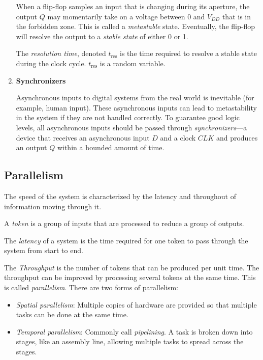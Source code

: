 \documentclass[12pt]{article}
\begin{document}
\begin{enumerate}
  When a flip-flop samples an input that is changing during its aperture, the output $Q$ may momentarily take on a voltage between 0 and $V_{DD}$ that is in the forbidden zone. This is called a \textit{metastable} state. Eventually, the flip-flop will resolve the output to a \textit{stable state} of either 0 or 1.

  The \textit{resolution time}, denoted $t_{\text{res}}$ is the time required to resolve a stable state during the clock cycle. $t_{\text{res}}$ is a random variable.

  \item \textbf{Synchronizers}

  Asynchronous inputs to digital systems from the real world is inevitable (for example, human input). These asynchronous inputs can lead to metastability in the system if they are not handled correctly. To guarantee good logic levels, all asynchronous inputs should be passed through \textit{synchronizers}---a device that receives an asynchronous input $D$ and a clock $CLK$ and produces an output $Q$ within a bounded amount of time.
\end{enumerate}

\subsection{Parallelism}

The speed of the system is characterized by the latency and throughout of information moving through it.

A \textit{token} is a group of inputs that are processed to reduce a group of outputs.

The \textit{latency} of a system is the time required for one token to pass through the system from start to end.

The \textit{Throughput} is the number of tokens that can be produced per unit time. The throughput can be improved by processing several tokens at the same time. This is called \textit{parallelism}. There are two forms of parallelism:

\begin{itemize}
  \item \textit{Spatial parallelism}: Multiple copies of hardware are provided so that multiple tasks can be done at the same time.
  \item \textit{Temporal parallelism}: Commonly call \textit{pipelining}. A task is broken down into stages, like an assembly line, allowing multiple tasks to spread across the stages.
\end{itemize}
\end{document}
